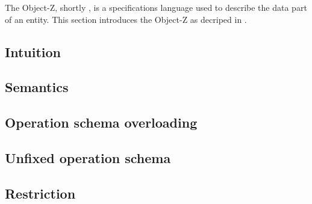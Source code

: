 The Object-Z, shortly \oz{}, is a specifications language used to describe the data part of an entity. This section introduces the Object-Z as decriped in \cite{olderog}.
\subsection{Intuition}
\label{sec_oz_intuition}


\subsection{Semantics}
\label{sec_oz_sem}


\subsection{Operation schema overloading}
\label{sec_oz_overloaded_operation}


\subsection{Unfixed operation schema}
\label{sec_oz_unfixed_operation}


\subsection{Restriction}
\label{sec_oz_restriction}

